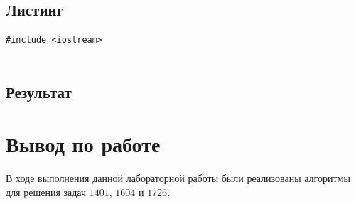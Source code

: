 \documentclass[a5paper, 10pt]{article}
\theoremstyle{definition}
\theoremstyle{plain}
\theoremstyle{remark}
\begin{document}
\subsection{Листинг}

\begin{center}
\begin{lstlisting}[label=some-code,caption={Исходный код для 1726}]
#include <iostream>


\end{lstlisting}
\end{center}

\subsection{Результат}



\newpage
\section{Вывод по работе}
В ходе выполнения данной лабораторной работы были реализованы алгоритмы для решения задач $1401$, $1604$ и $1726$. 
\end{document}
